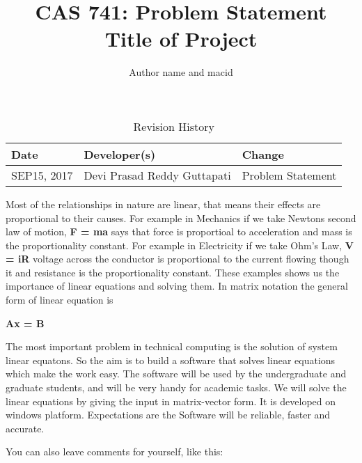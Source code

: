 \documentclass{article}
\title{CAS 741: Problem Statement\\Title of Project}
\author{Author name and macid}
\date{}
\begin{document}
\maketitle

\begin{table}[hp]
\caption{Revision History} \label{TblRevisionHistory}
\begin{tabularx}{\textwidth}{llX}
\toprule
\textbf{Date} & \textbf{Developer(s)} & \textbf{Change}\\
\midrule
SEP15, 2017 & Devi Prasad Reddy Guttapati & Problem Statement\\

\bottomrule
\end{tabularx}
\end{table}

Most  of the relationships in nature are linear, that
means their effects are proportional to their causes. For example in Mechanics
if we take Newtons second law of motion, \textbf{F = ma} says that force is
proportioal  to acceleration and mass is the proportionality constant. For example in Electricity if we take Ohm's Law, \textbf{V = iR} voltage across the conductor is proportional to the current flowing though it and resistance is the proportionality constant. These  examples shows us the importance of linear equations and solving them. In matrix notation the general form of linear equation is

 \centerline{\textbf{Ax = B}}


The most important problem in technical computing is the solution of system linear equatons. So the aim is to build a software that solves linear equations which make the work easy. The software will be used by the undergraduate and graduate students, and will be very handy for academic tasks. We will solve the linear equations by giving the input in matrix-vector form. It is developed on windows platform. Expectations are the Software will be reliable, faster and accurate.




                                                                                   
                                                                                          


You can also leave comments for yourself, like this:

\end{document}
